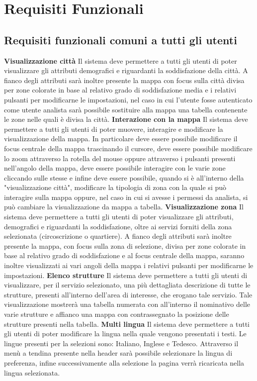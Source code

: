 \chapter{Requisiti Funzionali} 
    \section{Requisiti funzionali comuni a tutti gli utenti}
        \begin{rfList}
            \rfItem \textbf{Visualizzazione città} Il sistema deve permettere a tutti gli utenti di poter visualizzare gli attributi demografici e riguardanti la soddisfazione della città. A fianco degli attributi sarà inoltre 	presente la mappa con focus sulla città divisa per zone colorate in base al relativo grado di soddisfazione media e i relativi pulsanti per modificarne le impostazioni, nel caso in 	cui l'utente fosse autenticato come utente analista sarà possibile sostituire alla mappa una tabella contenente le zone nelle quali è divisa la città.
            \rfItem \textbf{Interazione con la mappa} Il sistema deve permettere a tutti gli utenti di poter muovere, interagire e modificare la visualizzazione della mappa. In particolare deve essere possibile modificare il focus centrale della mappa trascinando il cursore, deve essere possibile modificare lo zoom attraverso la rotella del mouse oppure attraverso i pulsanti presenti nell'angolo della mappa, deve essere possibile interagire con le varie zone cliccando sulle stesse e infine deve essere possibile, quando si è all'interno della "visualizzazione città", modificare la tipologia di zona con la quale si può interagire sulla mappa oppure, nel caso in cui si avesse i permessi da analista, si può cambiare la visualizzazione da mappa a tabella.
            \rfItem \textbf{Visualizzazione zona} Il sistema deve permettere a tutti gli utenti di poter visualizzare gli attributi, demografici e riguardanti la soddisfazione, oltre ai servizi forniti della zona selezionata (circoscrizione o quartiere). A fianco degli attributi sarà inoltre presente la mappa, con focus sulla zona di selezione, divisa per zone colorate in base al relativo grado di soddisfazione e al focus centrale della mappa, saranno inoltre visualizzati ai vari angoli della mappa i relativi pulsanti per modificarne le impostazioni.
            \rfItem \textbf{Elenco strutture} Il sistema deve permettere a tutti gli utenti di visualizzare, per il servizio selezionato, una più dettagliata descrizione di tutte le strutture, presenti all'interno dell'area di interesse, che erogano tale servizio. Tale visualizzazione mostrerà una tabella numerata con all'interno il nominativo delle varie strutture e affianco una mappa con contrassegnato la posizione delle strutture presenti nella tabella.
            \rfItem \textbf{Multi lingua} Il sistema deve permettere a tutti gli utenti di poter modificare la lingua nella quale vengono presentati i testi. Le lingue presenti per la selezioni sono: Italiano, Inglese e Tedesco. Attraverso il menù a tendina presente nella header sarà possibile selezionare la lingua di preferenza, infine successivamente alla selezione la pagina verrà ricaricata nella lingua selezionata.
        \end{rfList}
